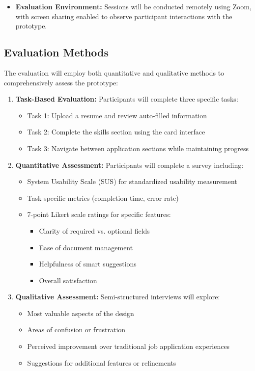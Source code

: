 \documentclass[
	letterpaper, %
]{jdf}
\begin{document}
\begin{sloppypar}
\begin{itemize}
    \item \textbf{Evaluation Environment:} Sessions will be conducted remotely using Zoom, with screen sharing enabled to observe participant interactions with the prototype.
\end{itemize}

\subsection{Evaluation Methods}

The evaluation will employ both quantitative and qualitative methods to comprehensively assess the prototype:

\begin{enumerate}
    \item \textbf{Task-Based Evaluation:} Participants will complete three specific tasks:
    \begin{itemize}
        \item Task 1: Upload a resume and review auto-filled information
        \item Task 2: Complete the skills section using the card interface
        \item Task 3: Navigate between application sections while maintaining progress
    \end{itemize}

    \item \textbf{Quantitative Assessment:} Participants will complete a survey including:
    \begin{itemize}
        \item System Usability Scale (SUS) for standardized usability measurement
        \item Task-specific metrics (completion time, error rate)
        \item 7-point Likert scale ratings for specific features:
        \begin{itemize}
            \item Clarity of required vs. optional fields
            \item Ease of document management
            \item Helpfulness of smart suggestions
            \item Overall satisfaction
        \end{itemize}
    \end{itemize}

    \item \textbf{Qualitative Assessment:} Semi-structured interviews will explore:
    \begin{itemize}
        \item Most valuable aspects of the design
        \item Areas of confusion or frustration
        \item Perceived improvement over traditional job application experiences
        \item Suggestions for additional features or refinements
    \end{itemize}
\end{enumerate}


\end{sloppypar}
\end{document}
